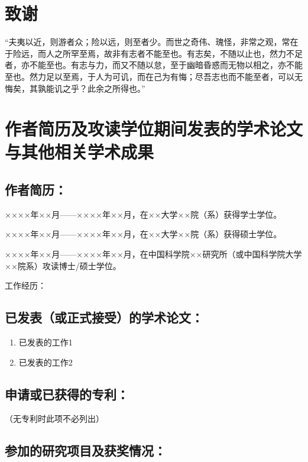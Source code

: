 \chapter[致谢]{致\quad 谢}%

“夫夷以近，则游者众；险以远，则至者少。而世之奇伟、瑰怪，非常之观，常在于险远，而人之所罕至焉，故非有志者不能至也。有志矣，不随以止也，然力不足者，亦不能至也。有志与力，而又不随以怠，至于幽暗昏惑而无物以相之，亦不能至也。然力足以至焉，于人为可讥，而在己为有悔；尽吾志也而不能至者，可以无悔矣，其孰能讥之乎？此余之所得也。”


\chapter{作者简历及攻读学位期间发表的学术论文与其他相关学术成果}

\section*{作者简历：}
××××年××月——××××年××月，在××大学××院（系）获得学士学位。

××××年××月——××××年××月，在××大学××院（系）获得硕士学位。

××××年××月——××××年××月，在中国科学院××研究所（或中国科学院大学××院系）攻读博士/硕士学位。

工作经历：

\section*{已发表（或正式接受）的学术论文：}

{
\setlist[enumerate]{}%
\begin{enumerate}[nosep]
    \item 已发表的工作1
    \item 已发表的工作2
\end{enumerate}
}

\section*{申请或已获得的专利：}

（无专利时此项不必列出）

\section*{参加的研究项目及获奖情况：}


\cleardoublepage[plain]%
